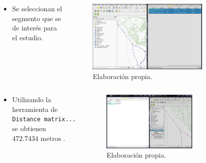 \documentclass[17pt, t, lualatex]{beamer}
\begin{document}
\begin{frame}[allowframebreaks]
  \begin{columns}
    \begin{column}{.3\textwidth}
      \begin{itemize}
        \item Se seleccionan el segmento que se de interés para el estudio. 
      \end{itemize}
    \end{column}

    \begin{column}{.7\textwidth}
      \begin{figure}[ht]
        \centering
        \includegraphics[width=0.8\textwidth]{img/QGIS-4.png}
        \caption{Elaboración propia.}
      \end{figure}
    \end{column}
  \end{columns}

  \begin{columns}
    \begin{column}{.3\textwidth}
      \begin{itemize}
        \item Utilizando la herramienta de \texttt{Distance matrix...} se obtienen $472.7434 \text{ metros}$ .
      \end{itemize}
    \end{column}

    \begin{column}{.7\textwidth}
      \begin{figure}[ht]
        \centering
        \includegraphics[width=0.7\textwidth]{img/QGIS-6.png}
        \caption{Elaboración propia.}
      \end{figure}
    \end{column}
  \end{columns}

\end{frame}
\end{document}
